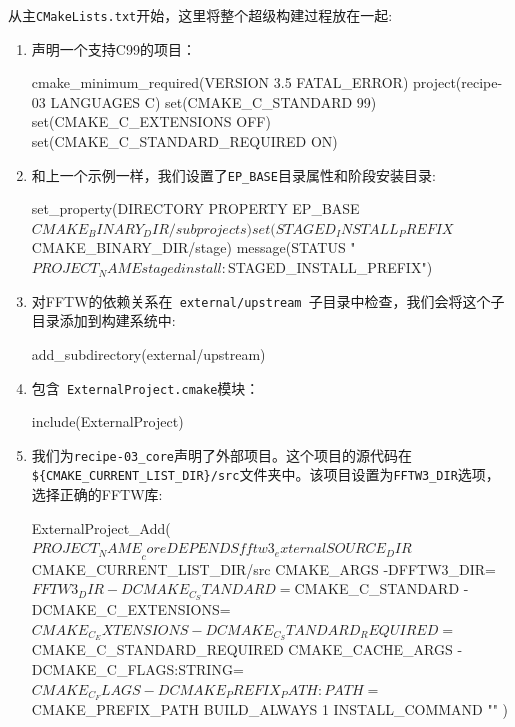 
从主\texttt{CMakeLists.txt}开始，这里将整个超级构建过程放在一起:

\begin{enumerate}
\item 声明一个支持C99的项目：

\begin{codebox}[cmake]
cmake_minimum_required(VERSION 3.5 FATAL_ERROR)
project(recipe-03 LANGUAGES C)
set(CMAKE_C_STANDARD 99)
set(CMAKE_C_EXTENSIONS OFF)
set(CMAKE_C_STANDARD_REQUIRED ON)
\end{codebox}

\item 和上一个示例一样，我们设置了\texttt{EP\_BASE}目录属性和阶段安装目录:

\begin{codebox}[cmake]
set_property(DIRECTORY PROPERTY EP_BASE ${CMAKE_BINARY_DIR}/subprojects)
set(STAGED_INSTALL_PREFIX ${CMAKE_BINARY_DIR}/stage)
message(STATUS "${PROJECT_NAME} staged install: ${STAGED_INSTALL_PREFIX}")
\end{codebox}

\item 对FFTW的依赖关系在\texttt{ external/upstream }子目录中检查，我们会将这个子目录添加到构建系统中:

\begin{codebox}[cmake]
add_subdirectory(external/upstream)
\end{codebox}

\item 包含\texttt{ ExternalProject.cmake}模块：

\begin{codebox}[cmake]
include(ExternalProject)
\end{codebox}

\item 我们为\texttt{recipe-03\_core}声明了外部项目。这个项目的源代码在\texttt{\$\{CMAKE\_CURRENT\_LIST\_DIR\}/src}文件夹中。该项目设置为\texttt{FFTW3\_DIR}选项，选择正确的FFTW库:

\begin{codebox}[cmake]
ExternalProject_Add(${PROJECT_NAME}_core
  DEPENDS
    fftw3_external
  SOURCE_DIR
    ${CMAKE_CURRENT_LIST_DIR}/src
  CMAKE_ARGS
    -DFFTW3_DIR=${FFTW3_DIR}
    -DCMAKE_C_STANDARD=${CMAKE_C_STANDARD}
    -DCMAKE_C_EXTENSIONS=${CMAKE_C_EXTENSIONS}
    -DCMAKE_C_STANDARD_REQUIRED=${CMAKE_C_STANDARD_REQUIRED}
  CMAKE_CACHE_ARGS
    -DCMAKE_C_FLAGS:STRING=${CMAKE_C_FLAGS}
    -DCMAKE_PREFIX_PATH:PATH=${CMAKE_PREFIX_PATH}
  BUILD_ALWAYS
    1
  INSTALL_COMMAND
    ""
  )
\end{codebox}

\end{enumerate}

